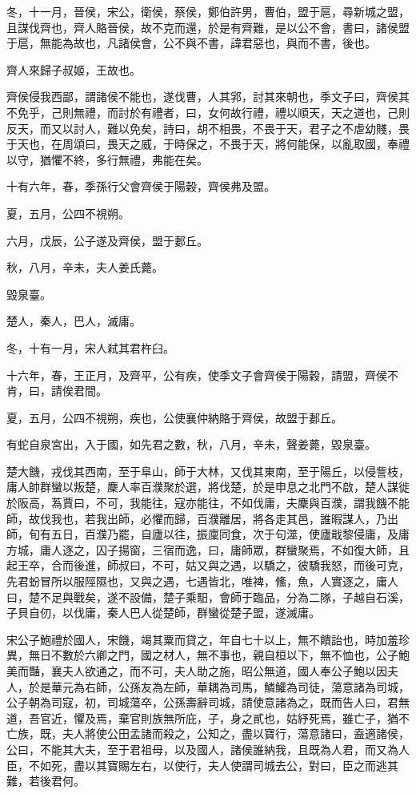 \begin{pinyinscope}
冬，十一月，晉侯，宋公，衛侯，蔡侯，鄭伯許男，曹伯，盟于扈，尋新城之盟，且謀伐齊也，齊人賂晉侯，故不克而還，於是有齊難，是以公不會，書曰，諸侯盟于扈，無能為故也，凡諸侯會，公不與不書，諱君惡也，與而不書，後也。

齊人來歸子叔姬，王故也。

齊侯侵我西鄙，謂諸侯不能也，遂伐曹，人其郛，討其來朝也，季文子曰，齊侯其不免乎，己則無禮，而討於有禮者，曰，女何故行禮，禮以順天，天之道也，己則反天，而又以討人，難以免矣，詩曰，胡不相畏，不畏于天，君子之不虐幼賤，畏于天也，在周頌曰，畏天之威，于時保之，不畏于天，將何能保，以亂取國，奉禮以守，猶懼不終，多行無禮，弗能在矣。

十有六年，春，季孫行父會齊侯于陽穀，齊侯弗及盟。

夏，五月，公四不視朔。

六月，戊辰，公子遂及齊侯，盟于郪丘。

秋，八月，辛未，夫人姜氏薨。

毀泉臺。

楚人，秦人，巴人，滅庸。

冬，十有一月，宋人弒其君杵臼。

十六年，春，王正月，及齊平，公有疾，使季文子會齊侯于陽穀，請盟，齊侯不肯，曰，請俟君間。

夏，五月，公四不視朔，疾也，公使襄仲納賂于齊侯，故盟于郪丘。

有蛇自泉宮出，入于國，如先君之數，秋，八月，辛未，聲姜薨，毀泉臺。

楚大饑，戎伐其西南，至于阜山，師于大林，又伐其東南，至于陽丘，以侵訾枝，庸人帥群蠻以叛楚，麇人率百濮聚於選，將伐楚，於是申息之北門不啟，楚人謀徙於阪高，蒍賈曰，不可，我能往，寇亦能往，不如伐庸，夫麇與百濮，謂我饑不能師，故伐我也，若我出師，必懼而歸，百濮離居，將各走其邑，誰暇謀人，乃出師，旬有五日，百濮乃罷，自廬以往，振廩同食，次于句澨，使廬戢黎侵庸，及庸方城，庸人逐之，囚子揚窗，三宿而逸，曰，庸師眾，群蠻聚焉，不如復大師，且起王卒，合而後進，師叔曰，不可，姑又與之遇，以驕之，彼驕我怒，而後可克，先君蚡冒所以服陘隰也，又與之遇，七遇皆北，唯裨，鯈，魚，人實逐之，庸人曰，楚不足與戰矣，遂不設備，楚子乘馹，會師于臨品，分為二隊，子越自石溪，子貝自仞，以伐庸，秦人巴人從楚師，群蠻從楚子盟，遂滅庸。

宋公子鮑禮於國人，宋饑，竭其粟而貸之，年自七十以上，無不饋詒也，時加羞珍異，無日不數於六卿之門，國之材人，無不事也，親自桓以下，無不恤也，公子鮑美而豔，襄夫人欲通之，而不可，夫人助之施，昭公無道，國人奉公子鮑以因夫人，於是華元為右師，公孫友為左師，華耦為司馬，鱗鱹為司徒，蕩意諸為司城，公子朝為司寇，初，司城蕩卒，公孫壽辭司城，請使意諸為之，既而告人曰，君無道，吾官近，懼及焉，棄官則族無所庇，子，身之貳也，姑紓死焉，雖亡子，猶不亡族，既，夫人將使公田孟諸而殺之，公知之，盡以寶行，蕩意諸曰，盍適諸侯，公曰，不能其大夫，至于君祖母，以及國人，諸侯誰納我，且既為人君，而又為人臣，不如死，盡以其寶賜左右，以使行，夫人使謂司城去公，對曰，臣之而逃其難，若後君何。


\end{pinyinscope}
